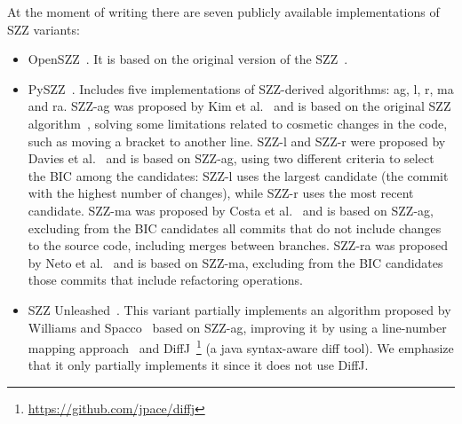 At the moment of writing there are seven publicly available implementations of SZZ variants:
\begin{itemize}
    \item OpenSZZ~\cite{lenarduzzi2020openszz}. It is based on the original version of the SZZ~\cite{sliwerski2005changes}.
    \item PySZZ~\cite{rosa2021evaluating}. Includes five implementations of SZZ-derived algorithms: ag, l, r, ma and ra.
    SZZ-ag was proposed by Kim et al.~\cite{kim2006automatic} and is based on the original SZZ algorithm~\cite{sliwerski2005changes}, solving some limitations related to cosmetic changes in the code, such as moving a bracket to another line.
    SZZ-l and SZZ-r were proposed by Davies et al.~\cite{davies2014comparing} and is based on SZZ-ag, using two different criteria to select the BIC among the candidates: SZZ-l uses the largest candidate (the commit with the highest number of changes), while SZZ-r uses the most recent candidate.
    SZZ-ma was proposed by Costa et al.~\cite{da2016framework} and is based on SZZ-ag, excluding from the BIC candidates all commits that do not include changes to the source code, including merges between branches.
    SZZ-ra was proposed by Neto et al.~\cite{neto2018impact} and is based on SZZ-ma, excluding from the BIC candidates those commits that include refactoring operations.
    \item SZZ Unleashed~\cite{borg2019szz}. This variant partially implements an algorithm proposed by Williams and Spacco~\cite{williams2008szz} based on SZZ-ag, improving it by using a line-number mapping approach~\cite{williams2008branching} and DiffJ~\footnote{\url{https://github.com/jpace/diffj}} (a java syntax-aware diff tool). We emphasize that it only partially implements it since it does not use DiffJ.
\end{itemize}


